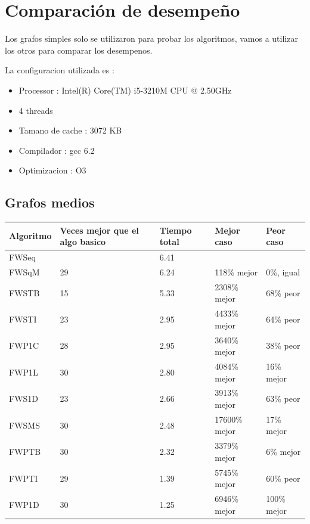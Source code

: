 \documentclass[a4paper,11pt]{article}
\begin{document}
\section{Comparación de desempeño}

Los grafos simples solo se utilizaron para probar los algoritmos, vamos a utilizar los otros para comparar los desempenos.

La configuracion utilizada es :

\begin{itemize}
  \item Processor : Intel(R) Core(TM) i5-3210M CPU @ 2.50GHz
  \item 4 threads
  \item Tamano de cache : 3072 KB
  \item Compilador : gcc 6.2
  \item Optimizacion : O3
\end{itemize}

\subsection{Grafos medios}

\begin{center}
  \begin{tabular}{p{2cm} | p{4.5cm} | p{2cm} | p{3cm} | p{3cm}}
    \centering \textbf{Algoritmo} & \centering \textbf {Veces mejor que el algo basico} & \centering \textbf{Tiempo total} & \centering \textbf{Mejor caso} & \centering \textbf{Peor caso} \tabularnewline
    \hline
    FWSeq & & 6.41 & & \\
    \hline
    \hline
    FWSqM & 29 & 6.24 & 118\% mejor & 0\%, igual \\
    \hline
    FWSTB & 15 & 5.33 & 2308\% mejor & 68\% peor \\
    \hline
    FWSTI & 23 & 2.95 & 4433\% mejor & 64\% peor \\
    \hline
    FWP1C & 28 & 2.95 & 3640\% mejor & 38\% peor \\
    \hline
    FWP1L & 30 & 2.80 & 4084\% mejor & 16\% mejor \\
    \hline
    FWS1D & 23 & 2.66 & 3913\% mejor & 63\% peor \\
    \hline
    FWSMS & 30 & 2.48 & 17600\% mejor & 17\% mejor \\
    \hline
    FWPTB & 30 & 2.32 & 3379\% mejor & 6\% mejor \\
    \hline
    FWPTI & 29 & 1.39 & 5745\% mejor & 60\% peor \\
    \hline
    FWP1D & 30 & 1.25 & 6946\% mejor & 100\% mejor \\
    \hline
  \end{tabular}
\end{center}
\end{document}
